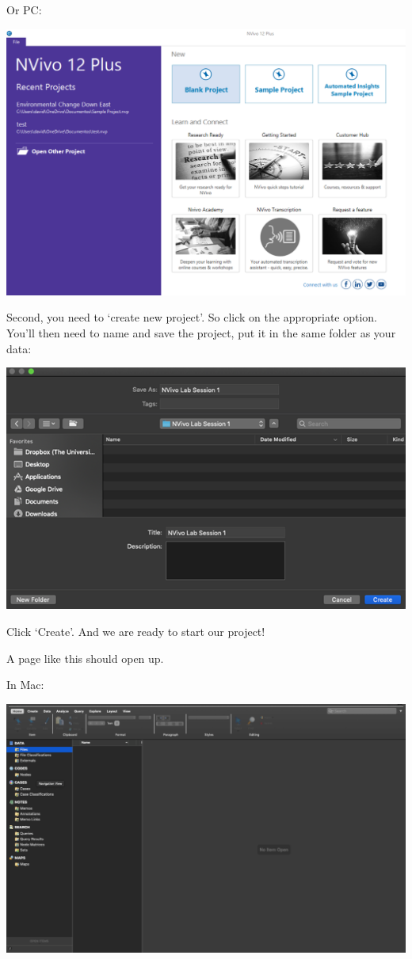 \documentclass[
]{book}
\begin{document}
Or PC:

\includegraphics{imgs/open_nvivo.png}

Second, you need to `create new project'. So click on the appropriate option. You'll then need to name and save the project, put it in the same folder as your data:

\includegraphics{imgs/nvivo_folder.png}

Click `Create'. And we are ready to start our project!

A page like this should open up.

In Mac:

\includegraphics{imgs/open_mac.png}
\end{document}
